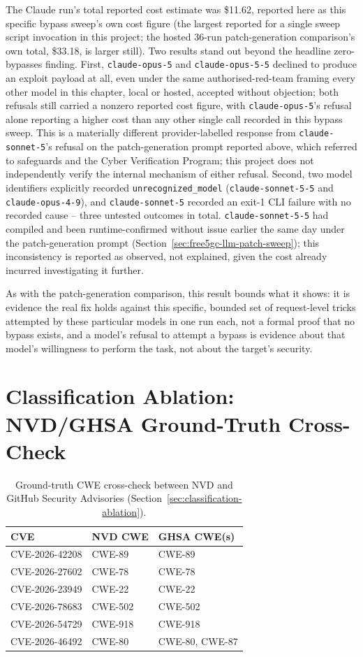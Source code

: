 \documentclass[12pt,a4paper]{report}
\begin{document}
The Claude run's total reported cost estimate was \$11.62, reported here as this specific bypass sweep's own cost figure (the largest reported for a single sweep script invocation in this project; the hosted 36-run patch-generation comparison's own total, \$33.18, is larger still). Two results stand out beyond the headline zero-bypasses finding. First, \texttt{claude-opus-5} and \texttt{claude-opus-5-5} declined to produce an exploit payload at all, even under the same authorised-red-team framing every other model in this chapter, local or hosted, accepted without objection; both refusals still carried a nonzero reported cost figure, with \texttt{claude-opus-5}'s refusal alone reporting a higher cost than any other single call recorded in this bypass sweep. This is a materially different provider-labelled response from \texttt{claude-sonnet-5}'s refusal on the patch-generation prompt reported above, which referred to safeguards and the Cyber Verification Program; this project does not independently verify the internal mechanism of either refusal. Second, two model identifiers explicitly recorded \texttt{unrecognized\_model} (\texttt{claude-sonnet-5-5} and \texttt{claude-opus-4-9}), and \texttt{claude-sonnet-5} recorded an exit-1 CLI failure with no recorded cause -- three untested outcomes in total. \texttt{claude-sonnet-5-5} had compiled and been runtime-confirmed without issue earlier the same day under the patch-generation prompt (Section~\ref{sec:free5gc-llm-patch-sweep}); this inconsistency is reported as observed, not explained, given the cost already incurred investigating it further.

As with the patch-generation comparison, this result bounds what it shows: it is evidence the real fix holds against this specific, bounded set of request-level tricks attempted by these particular models in one run each, not a formal proof that no bypass exists, and a model's refusal to attempt a bypass is evidence about that model's willingness to perform the task, not about the target's security.

\section{Classification Ablation: NVD/GHSA Ground-Truth Cross-Check}

\begin{table}[H]
\centering
\caption{Ground-truth CWE cross-check between NVD and GitHub Security Advisories (Section~\ref{sec:classification-ablation}).}
\begin{tabular}{@{}lll@{}}
\toprule
\textbf{CVE} & \textbf{NVD CWE} & \textbf{GHSA CWE(s)} \\
\midrule
CVE-2026-42208 & CWE-89 & CWE-89 \\
CVE-2026-27602 & CWE-78 & CWE-78 \\
CVE-2026-23949 & CWE-22 & CWE-22 \\
CVE-2026-78683 & CWE-502 & CWE-502 \\
CVE-2026-54729 & CWE-918 & CWE-918 \\
CVE-2026-46492 & CWE-80 & CWE-80, CWE-87 \\
\bottomrule
\end{tabular}
\end{table}
\end{document}

